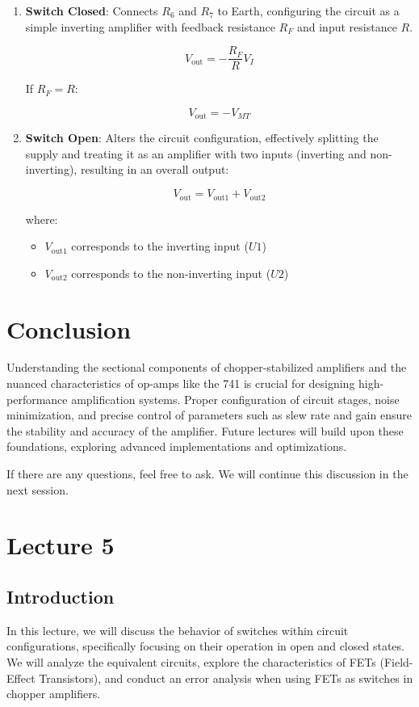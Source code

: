 \begin{enumerate}
    \item \textbf{Switch Closed}: Connects \( R_6 \) and \( R_7 \) to Earth, configuring the circuit as a simple inverting amplifier with feedback resistance \( R_F \) and input resistance \( R \).
    
    \[
    V_{\text{out}} = -\frac{R_F}{R} V_I
    \]
    
    If \( R_F = R \):
    
    \[
    V_{\text{out}} = -V_{MT}
    \]
    
    \item \textbf{Switch Open}: Alters the circuit configuration, effectively splitting the supply and treating it as an amplifier with two inputs (inverting and non-inverting), resulting in an overall output:
    
    \[
    V_{\text{out}} = V_{\text{out1}} + V_{\text{out2}}
    \]
    
    where:
    \begin{itemize}
        \item \( V_{\text{out1}} \) corresponds to the inverting input (\( U1 \))
        \item \( V_{\text{out2}} \) corresponds to the non-inverting input (\( U2 \))
    \end{itemize}
\end{enumerate}

\section{Conclusion}

Understanding the sectional components of chopper-stabilized amplifiers and the nuanced characteristics of op-amps like the 741 is crucial for designing high-performance amplification systems. Proper configuration of circuit stages, noise minimization, and precise control of parameters such as slew rate and gain ensure the stability and accuracy of the amplifier. Future lectures will build upon these foundations, exploring advanced implementations and optimizations.

If there are any questions, feel free to ask. We will continue this discussion in the next session.
\newpage
\section{Lecture 5}

\subsection*{Introduction}
In this lecture, we will discuss the behavior of switches within circuit configurations, specifically focusing on their operation in open and closed states. We will analyze the equivalent circuits, explore the characteristics of FETs (Field-Effect Transistors), and conduct an error analysis when using FETs as switches in chopper amplifiers.

